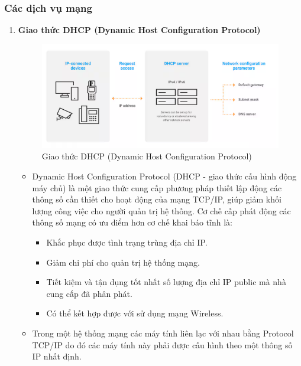 \documentclass[13pt]{article}
\begin{document}
\subsubsection{Các dịch vụ mạng}
\begin{enumerate}
    \item \textbf{Giao thức DHCP (Dynamic Host Configuration Protocol)}
    \begin{figure}[h!]
        \centering
        \includegraphics[width=0.7\linewidth]{image/1.png}
            \caption{Giao thức DHCP (Dynamic Host Configuration Protocol)}
            \label{fig:label1}
    \end{figure}
    \begin{itemize}
        \item Dynamic Host Configuration Protocol (DHCP - giao thức cấu hình động máy chủ) là một giao thức cung cấp phương pháp thiết lập động các thông số cần thiết cho hoạt động của mạng TCP/IP, giúp giảm khối lượng công việc cho người quản trị hệ thống. Cơ chế cấp phát động các thông số mạng có ưu điểm hơn cơ chế khai báo tĩnh là:
        \begin{itemize}
            \item Khắc phục được tình trạng trùng địa chỉ IP.
            \item Giảm chi phí cho quản trị hệ thống mạng.
            \item Tiết kiệm và tận dụng tốt nhất số lượng địa chỉ IP public mà nhà cung cấp đã phân phát.
            \item Có thể kết hợp được với sử dụng mạng Wireless.
        \end{itemize}
        \item Trong một hệ thống mạng các máy tính liên lạc với nhau bằng Protocol TCP/IP do đó các máy tính này phải được cấu hình theo một thông số IP nhất định.
    \end{itemize}


\end{enumerate}
\end{document}
